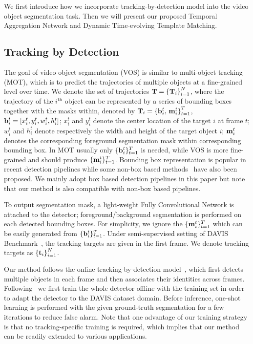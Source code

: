 \documentclass[10pt,twocolumn,letterpaper]{article}
\begin{document}
We first introduce how we incorporate tracking-by-detection model into the video object segmentation task.
Then we will present our proposed Temporal Aggregation Network and Dynamic Time-evolving Template Matching.

\subsection{Tracking by Detection}
\label{section: tbd}
The goal of video object segmentation (VOS) is similar to multi-object tracking (MOT),
which is to predict the trajectories of multiple objects at a fine-grained level over time.
We denote the set of trajectories ${\bf{T}} = {\left\{ {{{\bf{T}}_i}} \right\}_{i = 1}^N}$, where
the trajectory of the $i^\text{th}$ object can be represented by a series of bounding boxes together with the masks within, denoted by ${{\bf{T}}_i} = {\left\{ {{\bf{b}}_i^t, \, {\bf{m}}_i^t} \right\}_{t = 1}^T}$, ${\bf{b}}_i^t = \left[ {x_i^t,y_i^t,w_i^t,h_i^t} \right]$; $x_i^t$ and $y_i^t$ denote the center location of the target $i$ at frame $t$; $w_i^t$ and $h_i^t$ denote respectively the width and height of the target object $i$;
${{\bf{m}}_i^t}$ denotes the corresponding foreground segmentation mask within corresponding bounding box.
In MOT usually only ${\{{{\bf{b}}_i^t}\}_{t=1}^T}$ is needed, while VOS is more fine-grained and should produce ${\{{{\bf{m}}_i^t}\}_{t=1}^T}$.
Bounding box representation is popular in recent detection pipelines \cite{ren2015faster, he2017mask}
while some non-box based methods~\cite{chen2019tensormask} have also been proposed. We mainly adopt box based detection pipelines in this paper but note that our method is also compatible with non-box based pipelines.

To output segmentation mask, a light-weight Fully Convolutional Network is attached to the detector; foreground/background segmentation is performed on each detected bounding boxes.
For simplicity, we ignore the ${\{{{\bf{m}}_i^t}\}_{t=1}^T}$ which can be easily generated from ${\{{{\bf{b}}_i^t}\}_{t=1}^T}$.
Under semi-supervised setting of DAVIS Benchmark~\cite{perazzi2016davis, pont2017davis, caelles2018davis},  the tracking targets are given in the first frame.
We denote  tracking targets as ${\{{\bf{t}}_i\}}_{i=1}^{N}$.



Our method follows the online tracking-by-detection model~\cite{xiang2015learning}, which first detects multiple objects in each frame and then associates their identities across frames.
Following~\cite{caelles2017osvos, khoreva2017lucid} we first train the whole detector offline with the training set in order to adapt the detector to the DAVIS dataset domain.
Before inference, one-shot learning is performed with the given ground-truth segmentation for a few iterations to reduce false alarm.
Note that one advantage of our training strategy is that no tracking-specific training is required, which implies that our method can be readily extended to various applications.
\end{document}
